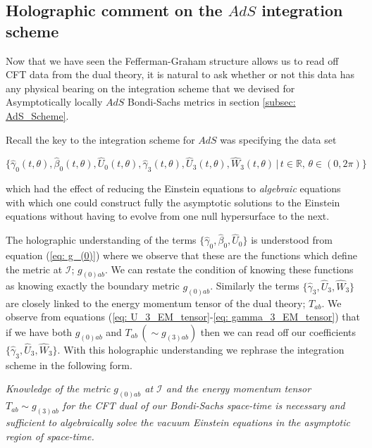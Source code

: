 \documentclass[a4paper,11pt]{article}
\numberwithin{equation}{section}
\begin{document}
\subsection{Holographic comment on the $AdS$ integration scheme} Now that we have seen the Fefferman-Graham structure allows us to read off CFT data from the dual theory, it is natural to ask whether or not this data has any physical bearing on the integration scheme that we devised for Asymptotically locally $AdS$ Bondi-Sachs metrics in section \ref{subsec: AdS_Scheme}. \par 

Recall the key to the integration scheme for $AdS$ was specifying the data set 

\begin{equation}
\{\hat{\gamma}_0(t, \theta), \hat{\beta}_0(t, \theta), \hat{U}_0(t, \theta), \hat{\gamma}_3(t, \theta), \hat{U}_3(t, \theta), \hat{W}_3(t, \theta) \, | \, t \in \mathbb{R} , \, \theta \in (0, 2\pi) \} 
\end{equation}
 
\noindent which had the effect of reducing the Einstein equations to \textit{algebraic} equations with which one could construct fully the asymptotic solutions to the Einstein equations without having to evolve from one null hypersurface to the next. \par

The holographic understanding of the terms $\{\hat{\gamma}_0, \hat{\beta}_0, \hat{U}_0 \}$ is understood from equation (\ref{eq: g_(0)}) where we observe that these are the functions which define the metric at $\mathscr{I}$; $g_{(0)ab}$. We can restate the condition of knowing these functions as knowing exactly the boundary metric $g_{(0)ab}$. Similarly the terms $\{\hat{\gamma}_3, \hat{U}_3, \hat{W}_3\}$ are closely linked to the energy momentum tensor of the dual theory; $T_{ab}$. We observe from equations (\ref{eq: U_3_EM_tensor}-\ref{eq: gamma_3_EM_tensor}) that if we have both $g_{(0)ab}$ and $T_{ab} \, ( \sim g_{(3)ab})$ then we can read off our coefficients $\{\hat{\gamma}_3, \hat{U}_3, \hat{W}_3\}$. With this holographic understanding we rephrase the integration scheme in the following form. \par 

\hspace{1cm}

\noindent \textit{Knowledge of the metric $g_{(0)ab}$ at $\mathscr{I}$ and the energy momentum tensor $T_{ab} \sim g_{(3)ab}$ for the CFT dual of our Bondi-Sachs space-time is necessary and sufficient to algebraically solve the vacuum Einstein equations in the asymptotic region of space-time.}
\end{document}
